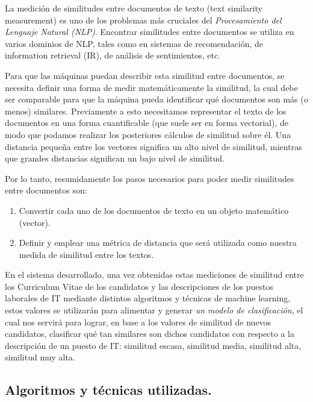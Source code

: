 \documentclass[12pt,a4paper]{article}
\begin{document}
\begin{sloppypar}
La medición de similitudes entre documentos de texto (text similarity measurement) es uno de los problemas más cruciales del \textit{Procesamiento del Lenguaje Natural (NLP)}. Encontrar similitudes entre documentos se utiliza en varios dominios de NLP, tales como en sistemas de recomendación, de information retrieval (IR), de análisis de sentimientos, etc.\cite{Similarity_calculation}

Para que las máquinas puedan describir esta similitud entre documentos, se necesita definir una forma de medir matemáticamente la similitud, la cual debe ser comparable para que la máquina pueda identificar qué documentos son más (o menos) similares. Previamente a esto necesitamos representar el texto de los documentos en una forma cuantificable (que suele ser en forma vectorial), de modo que podamos realizar los posteriores cálculos de similitud sobre él. Una distancia pequeña entre los vectores significa un alto nivel de similitud, mientras que grandes distancias significan un bajo nivel de similitud\cite{Similarity_calculation}.

Por lo tanto, resumidamente los pasos necesarios para poder medir similitudes entre documentos son\cite{Similarity_calculation}:
\begin{enumerate}
\item Convertir cada uno de los documentos de texto en un objeto matemático (vector).
\item Definir y emplear una métrica de distancia que será utilizada como nuestra medida de similitud entre los textos.
\end{enumerate}

\cleardoublepage    %

En el sistema desarrollado, una vez obtenidas estas mediciones de similitud entre los Curriculum Vitae de los candidatos y las descripciones de los puestos laborales de IT mediante distintos algoritmos y técnicas de machine learning, estos valores se utilizarán para alimentar y generar \textit{un modelo de clasificación}, el cual nos servirá para lograr, en base a los valores de similitud de nuevos candidatos, clasificar qué tan similares son dichos candidatos con respecto a la descripción de un puesto de IT: similitud escasa, similitud media, similitud alta, similitud muy alta.\\

\subsection{Algoritmos y técnicas utilizadas.}


\end{sloppypar}
\end{document}
